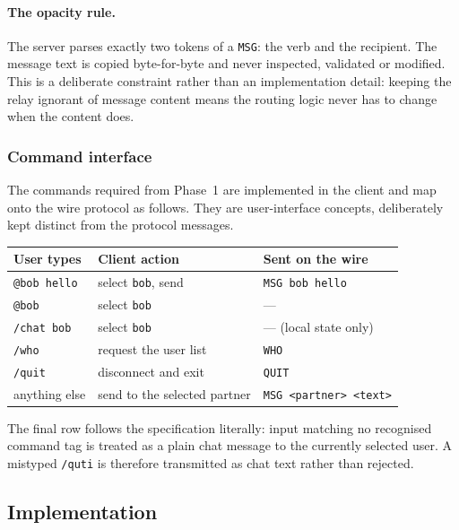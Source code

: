 \documentclass[11pt,a4paper]{article}
\begin{document}
\paragraph{The opacity rule.} The server parses exactly two tokens of a \texttt{MSG}: the verb and
the recipient. The message text is copied byte-for-byte and never inspected, validated or modified.
This is a deliberate constraint rather than an implementation detail: keeping the relay ignorant of
message content means the routing logic never has to change when the content does.

\subsubsection{Command interface}

The commands required from Phase~1 are implemented in the client and map onto the wire protocol as
follows. They are user-interface concepts, deliberately kept distinct from the protocol messages.

\begin{center}
\small
\begin{tabular}{@{}lll@{}}
\toprule
\textbf{User types} & \textbf{Client action} & \textbf{Sent on the wire} \\
\midrule
\texttt{@bob hello}   & select \texttt{bob}, send            & \texttt{MSG bob hello} \\
\texttt{@bob}         & select \texttt{bob}                  & --- \\
\texttt{/chat bob}    & select \texttt{bob}                  & --- (local state only) \\
\texttt{/who}         & request the user list                & \texttt{WHO} \\
\texttt{/quit}        & disconnect and exit                  & \texttt{QUIT} \\
anything else         & send to the selected partner         & \texttt{MSG <partner> <text>} \\
\bottomrule
\end{tabular}
\end{center}

The final row follows the specification literally: input matching no recognised command tag is
treated as a plain chat message to the currently selected user. A mistyped \texttt{/quti} is
therefore transmitted as chat text rather than rejected.

\subsection{Implementation}
\end{document}
